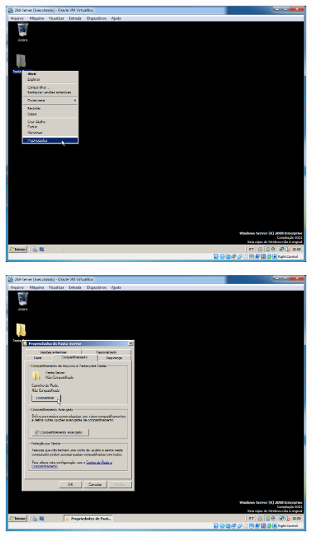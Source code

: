 \documentclass[10pt]{article}
\begin{document}
\begin{figure}[H]
    \centering
    \caption{}
    \label{fig:5113}
    \includegraphics[width=\linewidth]{images/windows_server/compartilhamento/003.png}
\end{figure}
\begin{figure}[H]
    \centering
    \caption{}
    \label{fig:5114}
    \includegraphics[width=\linewidth]{images/windows_server/compartilhamento/005.png}
\end{figure}
\end{document}

